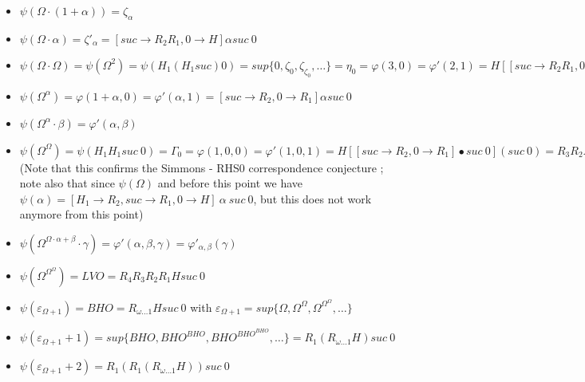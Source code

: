 \documentclass[10pt]{article}
\begin{document}
\begin{itemize}
\item \( \psi(\Omega \cdot (1+\alpha)) = \zeta_\alpha \)

\item \( \psi(\Omega \cdot \alpha) = \zeta'_\alpha = [suc \rightarrow R_2 R_1, 0 \rightarrow H] \alpha suc\ 0 \)

\item \( \psi(\Omega \cdot \Omega) = \psi(\Omega^2) = \psi (H_1 (H_1 suc) 0) = sup \lbrace 0, \zeta_0, \zeta_{\zeta_0}, \ldots \rbrace = \eta_0 = \varphi(3,0) = \varphi'(2,1) = H [[suc \rightarrow R_2 R_1, 0 \rightarrow H] \bullet suc\ 0] (suc\ 0) = R_2 (R_2 R_1) H suc\ 0 \)

\item \( \psi(\Omega^\alpha) = \varphi(1+\alpha,0) = \varphi'(\alpha,1) = [suc \rightarrow R_2, 0 \rightarrow R_1] \alpha suc\ 0 \)

\item \( \psi(\Omega^\alpha \cdot \beta) = \varphi'(\alpha,\beta) \)

\item \( \psi(\Omega^\Omega) = \psi(H_1 H_1 suc\ 0) = \Gamma_0 = \varphi(1,0,0) = \varphi'(1,0,1) = H [[suc \rightarrow R_2, 0 \rightarrow R_1] \bullet suc\ 0] (suc\ 0) = R_3 R_2 R_1 H suc\ 0 \) (Note that this confirms the Simmons - RHS0 correspondence conjecture ; note also that since \( \psi(\Omega) \) and before this point we have \( \psi(\alpha) = [H_1 \rightarrow R_2,suc \rightarrow R_1, 0 \rightarrow H]\ \alpha \ suc\ 0 \), but this does not work anymore from this point)

\item \( \psi(\Omega^{\Omega \cdot \alpha + \beta} \cdot \gamma) = \varphi'(\alpha,\beta,\gamma) = \varphi'_{\alpha,\beta}(\gamma) \)

\item \( \psi(\Omega^{\Omega^\Omega}) = LVO = R_4 R_3 R_2 R_1 H suc\ 0 \)
\item \( \psi(\varepsilon_{\Omega+1}) = BHO = R_{\omega \ldots 1} H suc\ 0 \) with \( \varepsilon_{\Omega+1} = sup \lbrace \Omega, \Omega^\Omega, \Omega^{\Omega^\Omega}, \ldots \rbrace \)


\item \( \psi(\varepsilon_{\Omega+1}+1) = sup \lbrace BHO, BHO^{BHO}, BHO^{BHO^{BHO}}, \ldots \rbrace = R_1 (R_{\omega \ldots 1} H) suc\ 0 \)

\item \( \psi(\varepsilon_{\Omega+1}+2) = R_1 (R_1 (R_{\omega \ldots 1} H)) suc\ 0 \)


\end{itemize}
\end{document}
